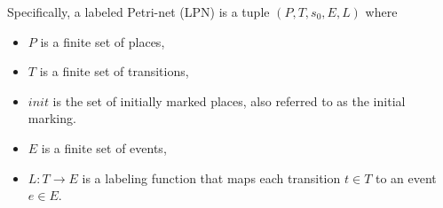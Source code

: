 \documentclass[conference]{IEEEtran}
\begin{document}
%
%


Specifically, a labeled Petri-net (LPN) is a tuple $(P, T, s_0, E, L)$ where
\begin{itemize}
\item $P$ is a finite set of places,
\item $T$ is a finite set of transitions,
\item $\mathit{init}$ is the set of initially marked places, also referred to as the initial marking.
\item $E$ is a finite set of events,
\item $L: T \rightarrow E$ is a labeling function that maps each transition $t \in T$ to an event $e \in E$.
\end{itemize}
\end{document}
